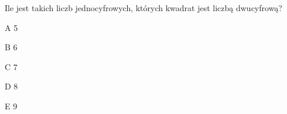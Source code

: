 \begin{tresc}
Ile jest takich liczb jednocyfrowych, których kwadrat jest liczbą dwucyfrową?
\end{tresc}
\begin{wariant}{A} 5 \end{wariant}
\begin{wariant}{B} 6 \end{wariant}
\begin{wariant}{C} 7 \end{wariant}
\begin{wariant}{D} 8 \end{wariant}
\begin{wariant}{E} 9 \end{wariant}
